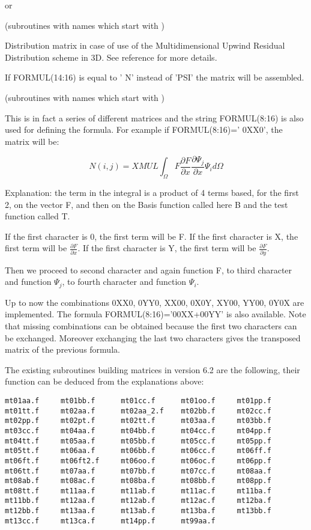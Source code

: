  or 

(subroutines with names which start with )

Distribution matrix in case of use of the Multidimensional Upwind Residual
Distribution scheme in 3D. See reference \citet{Janin1996} for more details.

If FORMUL(14:16) is equal to '   N' instead of 'PSI' the matrix will be
assembled.


(subroutines with names which start with )

This is in fact a series of different matrices and the string FORMUL(8:16) is
also used for defining the formula. For example if FORMUL(8:16)='     0XX0',
the matrix will be:

\[N(i,j)=XMUL \int _{\Omega }F\frac{\partial F}{\partial x} \frac{\partial \Psi _{j} }{\partial x} \Psi _{i} d\Omega  \]

Explanation: the term in the integral is a product of 4 terms based, for the
first 2, on the vector F, and then on the Basis function called here B and the
test function called T.

If the first character is 0, the first term will be F.
If the first character is X, the first term will be $\frac{\partial F}{\partial x} $.
If the first character is Y, the first term will be $\frac{\partial F}{\partial y} $.

Then we proceed to second character and again function F, to third character
and function $\Psi _{j} $, to fourth character and function $\Psi _{i} $.

Up to now the combinations 0XX0, 0YY0, XX00, 0X0Y, XY00, YY00, 0Y0X are
implemented. The formula FORMUL(8:16)='00XX+00YY' is also available. Note that
missing combinations can be obtained because the first two characters can be
exchanged. Moreover exchanging the last two characters gives the transposed
matrix of the previous formula.

The existing subroutines building matrices in version 6.2 are the following,
their function can be deduced from the explanations above:
\begin{verbatim}
mt01aa.f     mt01bb.f      mt01cc.f      mt01oo.f     mt01pp.f
mt01tt.f     mt02aa.f      mt02aa_2.f    mt02bb.f     mt02cc.f
mt02pp.f     mt02pt.f      mt02tt.f      mt03aa.f     mt03bb.f
mt03cc.f     mt04aa.f      mt04bb.f      mt04cc.f     mt04pp.f
mt04tt.f     mt05aa.f      mt05bb.f      mt05cc.f     mt05pp.f
mt05tt.f     mt06aa.f      mt06bb.f      mt06cc.f     mt06ff.f
mt06ft.f     mt06ft2.f     mt06oo.f      mt06oc.f     mt06pp.f
mt06tt.f     mt07aa.f      mt07bb.f      mt07cc.f     mt08aa.f
mt08ab.f     mt08ac.f      mt08ba.f      mt08bb.f     mt08pp.f
mt08tt.f     mt11aa.f      mt11ab.f      mt11ac.f     mt11ba.f
mt11bb.f     mt12aa.f      mt12ab.f      mt12ac.f     mt12ba.f
mt12bb.f     mt13aa.f      mt13ab.f      mt13ba.f     mt13bb.f
mt13cc.f     mt13ca.f      mt14pp.f      mt99aa.f
\end{verbatim}

